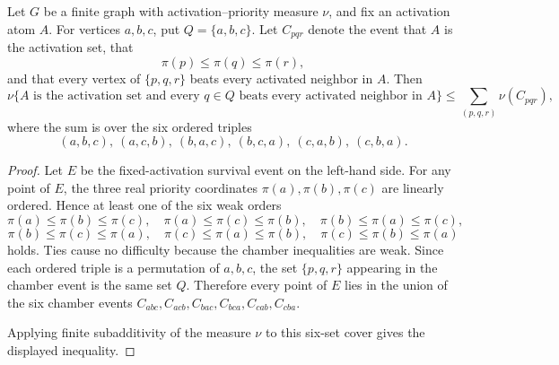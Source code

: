 \begin{helper}
Let $G$ be a finite graph with activation--priority measure $\nu$, and fix an
activation atom $A$.  For vertices $a,b,c$, put $Q=\{a,b,c\}$.  Let
$C_{pqr}$ denote the event that $A$ is the activation set, that
\[
\pi(p)\le \pi(q)\le \pi(r),
\]
and that every vertex of $\{p,q,r\}$ beats every activated neighbor in $A$.
Then
\[
\nu\{A\text{ is the activation set and every }q\in Q\text{ beats every
activated neighbor in }A\}
\le
\sum_{(p,q,r)}
\nu(C_{pqr}),
\]
where the sum is over the six ordered triples
\[
(a,b,c),\ (a,c,b),\ (b,a,c),\ (b,c,a),\ (c,a,b),\ (c,b,a).
\]
\end{helper}
\begin{proof}
Let $E$ be the fixed-activation survival event on the left-hand side.  For any
point of $E$, the three real priority coordinates $\pi(a),\pi(b),\pi(c)$ are
linearly ordered.  Hence at least one of the six weak orders
\[
\pi(a)\le\pi(b)\le\pi(c),\quad
\pi(a)\le\pi(c)\le\pi(b),\quad
\pi(b)\le\pi(a)\le\pi(c),
\]
\[
\pi(b)\le\pi(c)\le\pi(a),\quad
\pi(c)\le\pi(a)\le\pi(b),\quad
\pi(c)\le\pi(b)\le\pi(a)
\]
holds.  Ties cause no difficulty because the chamber inequalities are weak.
Since each ordered triple is a permutation of $a,b,c$, the set
$\{p,q,r\}$ appearing in the chamber event is the same set $Q$.  Therefore
every point of $E$ lies in the union of the six chamber events
$C_{abc},C_{acb},C_{bac},C_{bca},C_{cab},C_{cba}$.

Applying finite subadditivity of the measure $\nu$ to this six-set cover gives
the displayed inequality.
\end{proof}
